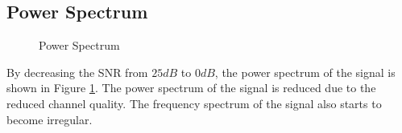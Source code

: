 \documentclass[10pt]{article}
\numberwithin{figure}{section}
\numberwithin{equation}{section}
\begin{document}
\subsection{Power Spectrum}
\begin{figure}[!h]
    \centering
    \caption{Power Spectrum}
    \label{fig:Power Spectrum}
\end{figure}
By decreasing the SNR from $25dB$ to $0dB$, the power spectrum of the signal is shown in Figure \ref{fig:Power Spectrum}. The power spectrum of the signal is reduced due to the reduced channel quality. The frequency spectrum of the signal also starts to become irregular.
\end{document}

